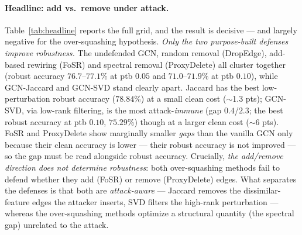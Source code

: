 \documentclass[11pt]{article}
\begin{document}
\paragraph{Headline: add vs.\ remove under attack.} Table~\ref{tab:headline} reports the full grid, and
the result is decisive --- and largely negative for the over-squashing hypothesis. \emph{Only the two
purpose-built defenses improve robustness.} The undefended GCN, random removal (DropEdge), add-based
rewiring (FoSR) and spectral removal (ProxyDelete) all cluster together (robust accuracy $76.7$--$77.1\%$
at ptb $0.05$ and $71.0$--$71.9\%$ at ptb $0.10$), while GCN-Jaccard and GCN-SVD stand clearly apart.
Jaccard has the best low-perturbation robust accuracy ($78.84\%$) at a small clean cost ($\sim$1.3 pts);
GCN-SVD, via low-rank filtering, is the most attack-\emph{immune} (gap $0.4$/$2.3$; the best robust
accuracy at ptb $0.10$, $75.29\%$) though at a larger clean cost ($\sim$6 pts). FoSR and ProxyDelete show
marginally smaller \emph{gaps} than the vanilla GCN only because their clean accuracy is lower --- their
robust accuracy is not improved --- so the gap must be read alongside robust accuracy. Crucially,
\emph{the add/remove direction does not determine robustness}: both over-squashing methods fail to defend
whether they add (FoSR) or remove (ProxyDelete) edges. What separates the defenses is that both are
\emph{attack-aware} --- Jaccard removes the dissimilar-feature edges the attacker inserts, SVD filters the
high-rank perturbation --- whereas the over-squashing methods optimize a structural quantity (the spectral
gap) unrelated to the attack.
\end{document}
